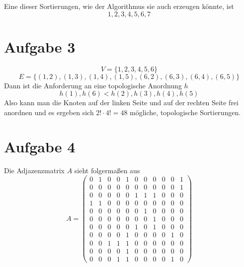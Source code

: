 \documentclass[10pt,a4paper]{article}
\begin{document}
Eine dieser Sortierungen, wie der Algorithmus sie auch erzeugen könnte, ist
\begin{equation}
  1, 2, 3, 4, 5, 6, 7
\end{equation}

\section{Aufgabe 3}
\begin{equation}
  V = \{ 1, 2, 3, 4, 5, 6 \}
\end{equation}
\begin{equation}
  E = \{ (1, 2), (1, 3), (1, 4), (1, 5), (6, 2), (6, 3), (6, 4), (6, 5) \}
\end{equation}
Dann ist die Anforderung an eine topologische Anordnung $h$
\begin{equation}
  h(1), h(6) < h(2), h(3), h(4), h(5)
\end{equation}
Also kann man die Knoten auf der linken Seite und auf der rechten Seite frei anordnen und es ergeben sich $2! \cdot 4! = 48$ mögliche, topologische Sortierungen.

\section{Aufgabe 4}
Die Adjazenzmatrix $A$ sieht folgermaßen aus
\setcounter{MaxMatrixCols}{20}
\begin{equation}
  A =
  \begin{pmatrix}
    0 & 1 & 0 & 0 & 1 & 0 & 0 & 0 & 0 & 0 & 1\\
    0 & 0 & 0 & 0 & 0 & 0 & 0 & 0 & 0 & 0 & 1\\
    0 & 0 & 0 & 0 & 0 & 1 & 1 & 1 & 0 & 0 & 0\\
    1 & 1 & 0 & 0 & 0 & 0 & 0 & 0 & 0 & 0 & 0\\
    0 & 0 & 0 & 0 & 0 & 0 & 1 & 0 & 0 & 0 & 0\\
    0 & 0 & 0 & 0 & 0 & 0 & 0 & 1 & 0 & 0 & 0\\
    0 & 0 & 0 & 0 & 0 & 1 & 0 & 1 & 0 & 0 & 0\\
    0 & 0 & 0 & 0 & 1 & 0 & 0 & 0 & 0 & 1 & 0\\
    0 & 0 & 1 & 1 & 1 & 0 & 0 & 0 & 0 & 0 & 0\\
    0 & 0 & 0 & 0 & 1 & 0 & 0 & 0 & 0 & 0 & 0\\
    0 & 0 & 0 & 1 & 1 & 0 & 0 & 0 & 0 & 1 & 0
  \end{pmatrix}
\end{equation}
\end{document}
